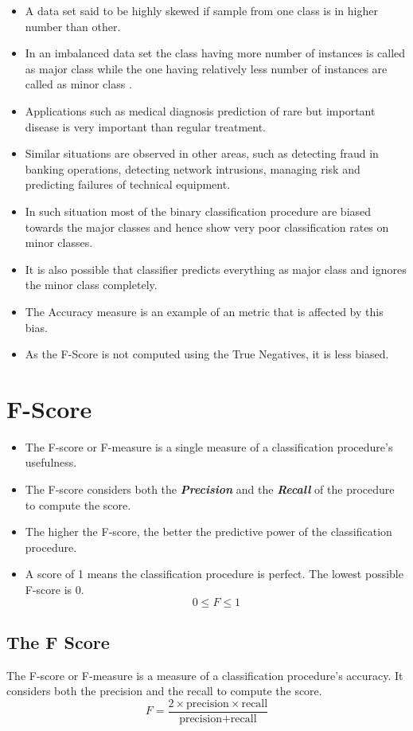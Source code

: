 \documentclass[a4paper,12pt]{article}
\begin{document}
\begin{itemize}
	\item  A data set said to be highly skewed if sample from one class is in higher number than other.
	\item  In an imbalanced data set the class having more number of instances is called as major class
	while the one having relatively less number of instances are called as minor class .
	\item  Applications such as medical diagnosis prediction of rare but important disease is very important
	than regular treatment.
	\item  Similar situations are observed in other areas, such as detecting fraud in banking operations,
	detecting network intrusions, managing risk and predicting failures of technical equipment.
	\item  In such situation most of the binary classification procedure are biased towards the major
	classes and hence show very poor classification rates on minor classes.
	\item  It is also possible that classifier predicts everything as major class and ignores the minor class
	completely.
	\item  The Accuracy measure is an example of an metric that is affected by this bias.
	\item  As the F-Score is not computed using the True Negatives, it is less biased.
	
\end{itemize}

\section*{F-Score}	

	\begin{itemize}
		\item The F-score or F-measure is a single measure of a classification procedure's usefulness. 
		\item The F-score considers both the \textit{\textbf{Precision}} and the \textit{\textbf{Recall}} of the procedure to compute the score.
		\item The higher the F-score, the better the predictive power of the 
		classification procedure. 
		\item A score of 1 means the classification procedure is perfect. The lowest possible F-score is 0.
		\[ 0 \leq F \leq 1 \]
	\end{itemize}
\subsection*{The F Score}
The F-score or F-measure is a measure of a classification procedure’s accuracy.
It considers both the precision and the recall to compute the score.
\[ F = \frac{2 \times \mbox{precision} \times \mbox{recall}}{\mbox{precision} + \mbox{recall}}\]
	
\end{document}
